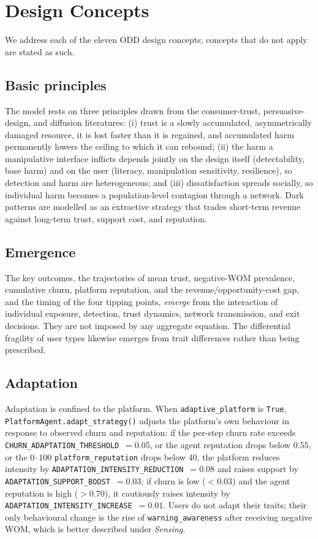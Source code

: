 \documentclass[11pt]{article}
\newcommand{\code}[1]{\texttt{#1}}
\begin{document}
\section{Design Concepts}
\label{sec:design}

We address each of the eleven ODD design concepts; concepts that do not apply are
stated as such.

\subsection{Basic principles}
The model rests on three principles drawn from the consumer-trust, persuasive-design,
and diffusion literatures: (i) trust is a slowly accumulated, asymmetrically
damaged resource, it is lost faster than it is regained, and accumulated harm
permanently lowers the ceiling to which it can rebound; (ii) the harm a
manipulative interface inflicts depends jointly on the design itself
(detectability, base harm) and on the user (literacy, manipulation sensitivity,
resilience), so detection and harm are heterogeneous; and (iii) dissatisfaction
spreads socially, so individual harm becomes a population-level contagion through
a network. Dark patterns are modelled as an extractive strategy that trades
short-term revenue against long-term trust, support cost, and reputation.

\subsection{Emergence}
The key outcomes, the trajectories of mean trust, negative-WOM prevalence,
cumulative churn, platform reputation, and the revenue/opportunity-cost gap, and
the timing of the four tipping points, \emph{emerge} from the interaction of
individual exposure, detection, trust dynamics, network transmission, and exit
decisions. They are not imposed by any aggregate equation. The differential
fragility of user types likewise emerges from trait differences rather than being
prescribed.

\subsection{Adaptation}
Adaptation is confined to the platform. When \code{adaptive\_platform} is
\code{True}, \code{PlatformAgent.adapt\_strategy()} adjusts the platform's own
behaviour in response to observed churn and reputation: if the per-step churn
rate exceeds \code{CHURN\_ADAPTATION\_THRESHOLD}~$=0.05$, or the agent reputation
drops below $0.55$, or the $0$--$100$ \code{platform\_reputation} drops below
$40$, the platform reduces intensity by
\code{ADAPTATION\_INTENSITY\_REDUCTION}~$=0.08$ and raises support by
\code{ADAPTATION\_SUPPORT\_BOOST}~$=0.03$; if churn is low ($<0.03$) and the
agent reputation is high ($>0.70$), it cautiously raises intensity by
\code{ADAPTATION\_INTENSITY\_INCREASE}~$=0.01$. Users do not adapt their traits;
their only behavioural change is the rise of \code{warning\_awareness} after
receiving negative WOM, which is better described under \emph{Sensing}.
\end{document}
